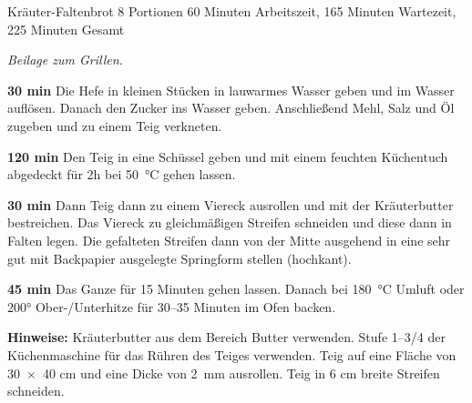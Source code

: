\begin{recipe}{Kräuter-Faltenbrot} {8 Portionen} {60 Minuten Arbeitszeit, 165 Minuten Wartezeit, 225 Minuten Gesamt}

  \freeform
  \textit{Beilage zum Grillen.}

  \textbf{30 min}
  Die Hefe in kleinen Stücken in lauwarmes Wasser geben und im Wasser auflösen.
  Danach den Zucker ins Wasser geben.
  Anschließend Mehl, Salz und Öl zugeben und zu einem Teig verkneten.

  \newstep
  \textbf{120 min}
  Den Teig in eine Schüssel geben und mit einem feuchten Küchentuch abgedeckt für 2h bei 50 °C gehen lassen.

  \textbf{30 min}
  Dann Teig dann zu einem Viereck ausrollen und mit der Kräuterbutter bestreichen.
  Das Viereck zu gleichmäßigen Streifen schneiden und diese dann in Falten legen.
  Die gefalteten Streifen dann von der Mitte ausgehend in eine sehr gut mit Backpapier ausgelegte Springform stellen (hochkant).

  \newstep
  \textbf{45 min}
  Das Ganze für 15 Minuten gehen lassen.
  Danach bei 180 °C Umluft oder 200° Ober-/Unterhitze für 30--35 Minuten im Ofen backen.

  \freeform
  \hrulefill

  \freeform
  \textbf{Hinweise:}
  Kräuterbutter aus dem Bereich Butter verwenden.
  Stufe 1--3/4 der Küchenmaschine für das Rühren des Teiges verwenden.
  Teig auf eine Fläche von 30 × 40 cm und eine Dicke von 2 mm ausrollen.
  Teig in 6 cm breite Streifen schneiden.

  \end{recipe}
